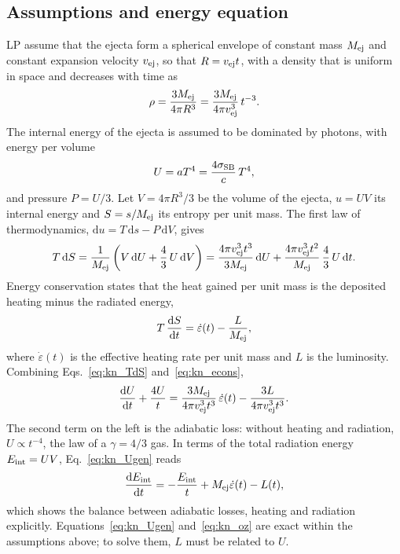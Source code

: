 \subsection{Assumptions and energy equation}\label{sec:onezone_eq}

LP assume that the ejecta form a spherical envelope of constant mass $M_{\rm ej}$ and constant expansion velocity $v_{\rm ej}$, so that $R=v_{\rm ej}t$, with a density that is uniform in space and decreases with time as
\begin{equation}\label{eq:kn_rho}
  \rho=\frac{3M_{\rm ej}}{4\pi R^3}=\frac{3M_{\rm ej}}{4\pi v_{\rm ej}^3}\,t^{-3}.
\end{equation}
The internal energy of the ejecta is assumed to be dominated by photons, with energy per volume
\begin{equation}\label{eq:kn_U}
  U=aT^4=\frac{4\sigma_{\rm SB}}{c}\,T^4 ,
\end{equation}
and pressure $P=U/3$.
Let $V=4\pi R^3/3$ be the volume of the ejecta, $u=UV$ its internal energy and $S=s/M_{\rm ej}$ its entropy per unit mass.
The first law of thermodynamics, $\mathrm{d}u=T\,\mathrm{d}s-P\,\mathrm{d}V$, gives
\begin{equation}\label{eq:kn_TdS}
  T\,\mathrm{d}S=\frac{1}{M_{\rm ej}}\left(V\,\mathrm{d}U+\frac43\,U\,\mathrm{d}V\right)
  =\frac{4\pi v_{\rm ej}^3t^3}{3M_{\rm ej}}\,\mathrm{d}U+\frac{4\pi v_{\rm ej}^3t^2}{M_{\rm ej}}\,\frac43\,U\,\mathrm{d}t .
\end{equation}
Energy conservation states that the heat gained per unit mass is the deposited heating minus the radiated energy,
\begin{equation}\label{eq:kn_econs}
  T\,\frac{\mathrm{d}S}{\mathrm{d}t}=\dot\varepsilon(t)-\frac{L}{M_{\rm ej}} ,
\end{equation}
where $\dot\varepsilon(t)$ is the effective heating rate per unit mass and $L$ is the luminosity.
Combining Eqs.~\ref{eq:kn_TdS} and~\ref{eq:kn_econs},
\begin{equation}\label{eq:kn_Ugen}
  \frac{\mathrm{d}U}{\mathrm{d}t}+\frac{4U}{t}=\frac{3M_{\rm ej}}{4\pi v_{\rm ej}^3t^3}\,\dot\varepsilon(t)-\frac{3L}{4\pi v_{\rm ej}^3t^3} .
\end{equation}
The second term on the left is the adiabatic loss: without heating and radiation, $U\propto t^{-4}$, the law of a $\gamma=4/3$ gas.
In terms of the total radiation energy $E_{\rm int}=UV$, Eq.~\ref{eq:kn_Ugen} reads
\begin{equation}\label{eq:kn_oz}
  \frac{\mathrm{d}E_{\rm int}}{\mathrm{d}t}=-\frac{E_{\rm int}}{t}+M_{\rm ej}\dot\varepsilon(t)-L(t),
\end{equation}
which shows the balance between adiabatic losses, heating and radiation explicitly.
Equations~\ref{eq:kn_Ugen} and~\ref{eq:kn_oz} are exact within the assumptions above; to solve them, $L$ must be related to $U$.

